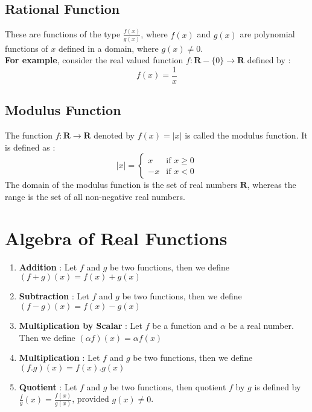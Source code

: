 \documentclass[12pt, letterpaper]{article}
\begin{document}
\subsection{Rational Function}
These are functions of the type $\frac{f(x)}{g(x)}$, where $f(x)$ and $g(x)$ are polynomial functions of $x$ defined in a domain, where $g(x) \neq 0$.\\
\textbf{For example}, consider the real valued function $f : \mathbf{R} - \{0\} \rightarrow \mathbf{R}$ defined by : 
\begin{displaymath}
f(x) = \frac{1}{x}
\end{displaymath}

\subsection{Modulus Function}
The function $f : \mathbf{R} \rightarrow \mathbf{R}$ denoted by $f(x) = |x|$ is called the modulus function. It is defined as : 
\begin{displaymath}
|x| = \begin{cases}
x & \text{if } x \geq 0 \\
-x & \text{if } x < 0
\end{cases}
\end{displaymath}
The domain of the modulus function is the set of real numbers $\mathbf{R}$, whereas the range is the set of all non-negative real numbers.

\section{Algebra of Real Functions}
\begin{enumerate}
    \item \textbf{Addition} : Let $f$ and $g$ be two functions, then we define $(f+g) (x) = f(x) + g(x)$
    \item \textbf{Subtraction} : Let $f$ and $g$ be two functions, then we define $(f-g) (x) = f(x) - g(x)$
    \item \textbf{Multiplication by Scalar} : Let $f$ be a function and $\alpha$ be a real number. Then we define $(\alpha f)(x) = \alpha f(x)$
    \item \textbf{Multiplication} : Let $f$ and $g$ be two functions, then we define $(f.g) (x) = f(x) . g(x)$
    \item \textbf{Quotient} : Let $f$ and $g$ be two functions, then quotient $f$ by $g$ is defined by $\frac{f}{g}(x) = \frac{f(x)}{g(x)}$, provided $g(x) \neq 0$.
\end{enumerate}
\end{document}
